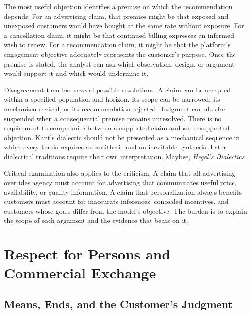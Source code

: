 The most useful objection identifies a premise on which the
recommendation depends. For an advertising claim, that premise might be
that exposed and unexposed customers would have bought at the same rate
without exposure. For a cancellation claim, it might be that continued
billing expresses an informed wish to renew. For a recommendation claim,
it might be that the platform's engagement objective adequately
represents the customer's purpose. Once the premise is stated, the
analyst can ask which observation, design, or argument would support it
and which would undermine it.

Disagreement then has several possible resolutions. A claim can be
accepted within a specified population and horizon. Its scope can be
narrowed, its mechanism revised, or its recommendation rejected.
Judgment can also be suspended when a consequential premise remains
unresolved. There is no requirement to compromise between a supported
claim and an unsupported objection. Kant's dialectic should not be
presented as a mechanical sequence in which every thesis requires an
antithesis and an inevitable synthesis. Later dialectical traditions
require their own interpretation.
\href{https://plato.stanford.edu/entries/hegel-dialectics/}{Maybee,
\emph{Hegel's Dialectics}}

Critical examination also applies to the criticism. A claim that all
advertising overrides agency must account for advertising that
communicates useful price, availability, or quality information. A claim
that personalization always benefits customers must account for
inaccurate inferences, concealed incentives, and customers whose goals
differ from the model's objective. The burden is to explain the scope of
each argument and the evidence that bears on it.


\hypertarget{M09-respect-for-persons-and-commercial-exchange}{%
\section{Respect for Persons and Commercial
Exchange}\label{M09-respect-for-persons-and-commercial-exchange}}

\noindent \hypertarget{M09-means-ends-and-the-customers-judgment}{%
\subsection{Means, Ends, and the Customer's
Judgment}\label{M09-means-ends-and-the-customers-judgment}}

